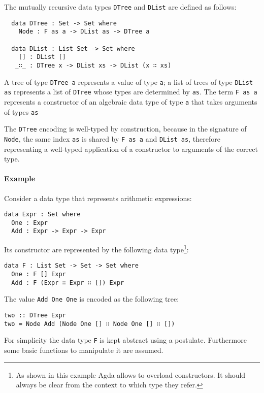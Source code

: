 \documentclass[../Thesis.tex]{subfiles}
\begin{document}
		The mutually recursive data types \texttt{DTree} and \texttt{DList} are
		defined as follows: 
					
\begin{verbatim}
  data DTree : Set -> Set where
    Node : F as a -> DList as -> DTree a

  data DList : List Set -> Set where
    [] : DList []
   _∷_ : DTree x -> DList xs -> DList (x ∷ xs)
\end{verbatim}
	
		A tree of type \texttt{DTree a} represents a value of type \texttt{a}; 
		a list of trees of type \texttt{DList as} represents a list of 
		\texttt{DTree} whose types are determined by \texttt{as}.
		The term \texttt{F as a} represents a constructor of an algebraic data
		type of type \texttt{a} that takes arguments of types \texttt{as} 

		The \texttt{DTree} encoding is well-typed by construction, because 
		in the signature of \texttt{Node}, the same index \texttt{as}
		is shared by \texttt{F as a} and \texttt{DList as}, therefore  
		representing a well-typed application of a constructor to arguments of 
		the correct type.


	\paragraph{Example}
	Consider a data type that represents arithmetic expressions:
\begin{verbatim}
data Expr : Set where
  One : Expr
  Add : Expr -> Expr -> Expr
\end{verbatim}

	Its constructor are represented by the following data type\footnote{As shown in this example Agda allows to overload constructors. It should
	always be clear from the context to which type they refer.}:
\begin{verbatim}
data F : List Set -> Set -> Set where
  One : F [] Expr
  Add : F (Expr ∷ Expr ∷ []) Expr
\end{verbatim}

	The value \texttt{Add One One} is encoded as
	the following tree:
\begin{verbatim}
two :: DTree Expr
two = Node Add (Node One [] ∷ Node One [] ∷ [])
\end{verbatim}

		For simplicity the data type \texttt{F} is kept abstract using a postulate. 
		Furthermore some basic functions to manipulate it are assumed.
		
\end{document}
